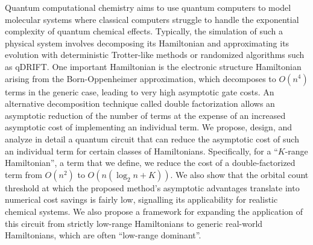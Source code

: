 %
%

Quantum computational chemistry aims to use quantum computers to model molecular systems where classical computers struggle to handle the exponential complexity of quantum chemical effects. Typically, the simulation of such a physical system involves decomposing its Hamiltonian and approximating its evolution with deterministic Trotter-like methods or randomized algorithms such as qDRIFT. One important Hamiltonian is the electronic structure Hamiltonian arising from the Born-Oppenheimer approximation, which decomposes to $O(n^4)$ terms in the generic case, leading to very high asymptotic gate costs. An alternative decomposition technique called double factorization allows an asymptotic reduction of the number of terms at the expense of an increased asymptotic cost of implementing an individual term. We propose, design, and analyze in detail a quantum circuit that can reduce the asymptotic cost of such an individual term for certain classes of Hamiltonians. Specifically, for a ``$K$-range Hamiltonian'', a term that we define, we reduce the cost of a double-factorized term from $O(n^2)$ to $O(n(\log_2{n} + K))$. We also show that the orbital count threshold at which the proposed method's asymptotic advantages translate into numerical cost savings is fairly low, signalling its applicability for realistic chemical systems. We also propose a framework for expanding the application of this circuit from strictly low-range Hamiltonians to generic real-world Hamiltonians, which are often ``low-range dominant''.